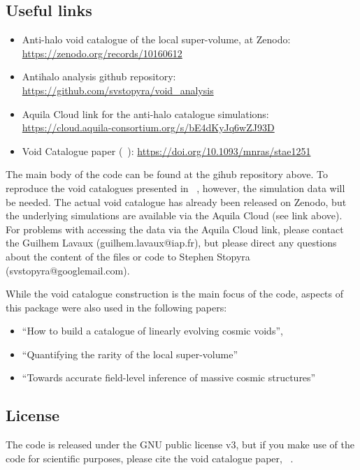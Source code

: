 \documentclass{article}
\begin{document}
	\subsection{Useful links}
	
	\begin{itemize}
		\item Anti-halo void catalogue of the local super-volume, at Zenodo: \url{https://zenodo.org/records/10160612}
		\item Antihalo analysis github repository: \url{https://github.com/svstopyra/void_analysis}
		\item Aquila Cloud link for the anti-halo catalogue simulations: \url{https://cloud.aquila-consortium.org/s/bE4dKyJq6wZJ93D}
		\item Void Catalogue paper (~\citet{10.1093/mnras/stae1251}): \url{https://doi.org/10.1093/mnras/stae1251}
	\end{itemize}
	
	The main body of the code can be found at the gihub repository above. To reproduce the void catalogues presented in ~\citet{10.1093/mnras/stae1251}, however, the simulation data will be needed. The actual void catalogue has already been released on Zenodo, but the underlying simulations are available via the Aquila Cloud (see link above). For problems with accessing the data via the Aquila Cloud link, please contact the Guilhem Lavaux (guilhem.lavaux@iap.fr), but please direct any questions about the content of the files or code to Stephen Stopyra (svstopyra@googlemail.com).
	
	While the void catalogue construction is the main focus of the code, aspects of this package were also used in the following papers:
	
	\begin{itemize}
		\item ``How to build a catalogue of linearly evolving cosmic voids'', ~\citet{stopyra2021build}
		\item ``Quantifying the rarity of the local super-volume''~\citet{stopyra2021quantifying}
		\item ``Towards accurate field-level inference of massive cosmic structures'' ~\citet{10.1093/mnras/stad3170}
	\end{itemize}
	
	\subsection{License}
	
	The code is released under the GNU public license v3, but if you make use of the code for scientific purposes, please cite the void catalogue paper, ~\citet{10.1093/mnras/stae1251}.
	
\end{document}
